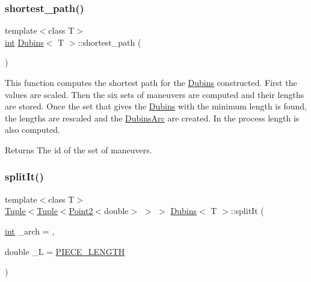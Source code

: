 \subsubsection{\texorpdfstring{shortest\_path()}{shortest\_path()}}
{\footnotesize\ttfamily template$<$class T$>$ \\
\mbox{\hyperlink{draw_8hh_aa620a13339ac3a1177c86edc549fda9b}{int}} \mbox{\hyperlink{class_dubins}{Dubins}}$<$ T $>$\+::shortest\+\_\+path (\begin{DoxyParamCaption}{ }\end{DoxyParamCaption})\hspace{0.3cm}{\ttfamily [inline]}}



This function computes the shortest path for the \mbox{\hyperlink{class_dubins}{Dubins}} constructed. First the values are scaled. Then the six sets of maneuvers are computed and their lengths are stored. Once the set that gives the \mbox{\hyperlink{class_dubins}{Dubins}} with the minimum length is found, the lengths are rescaled and the {\ttfamily \mbox{\hyperlink{class_dubins_arc}{Dubins\+Arc}}} are created. In the process length is also computed. 

\begin{DoxyReturn}{Returns}
The id of the set of maneuvers. 
\end{DoxyReturn}
\mbox{\label{class_dubins_a68d6703215b12b2933346efd77563575}} 
\subsubsection{\texorpdfstring{splitIt()}{splitIt()}}
{\footnotesize\ttfamily template$<$class T$>$ \\
\mbox{\hyperlink{class_tuple}{Tuple}}$<$\mbox{\hyperlink{class_tuple}{Tuple}}$<$\mbox{\hyperlink{class_point2}{Point2}}$<$double$>$ $>$ $>$ \mbox{\hyperlink{class_dubins}{Dubins}}$<$ T $>$\+::split\+It (\begin{DoxyParamCaption}\item[{\mbox{\hyperlink{draw_8hh_aa620a13339ac3a1177c86edc549fda9b}{int}}}]{\+\_\+arch = {},  }\item[{double}]{\+\_\+L = {\ttfamily \mbox{\hyperlink{dubins_8hh_a5b2500ca93a5100f73dc442d3cfea7d4}{P\+I\+E\+C\+E\+\_\+\+L\+E\+N\+G\+TH}}} }\end{DoxyParamCaption})\hspace{0.3cm}{\ttfamily [inline]}}

